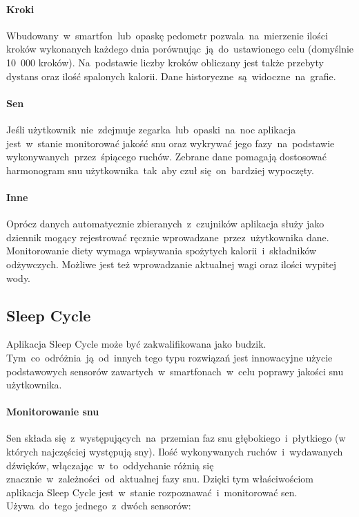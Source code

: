 \paragraph{Kroki} Wbudowany~w~smartfon~lub~opaskę pedometr pozwala~na~mierzenie ilości kroków wykonanych każdego dnia porównując~ją~do~ustawionego celu (domyślnie 10~000 kroków). Na~podstawie liczby kroków obliczany jest także przebyty dystans oraz ilość spalonych kalorii. Dane historyczne~są~widoczne~na~grafie.

\paragraph{Sen} Jeśli użytkownik~nie~zdejmuje zegarka~lub~opaski~na~noc aplikacja jest~w~stanie monitorować jakość snu oraz wykrywać jego fazy~na~podstawie wykonywanych~przez~śpiącego ruchów. Zebrane dane pomagają dostosować harmonogram snu użytkownika~tak~aby czuł się~on~bardziej wypoczęty.

\paragraph{Inne} Oprócz danych automatycznie zbieranych~z~czujników aplikacja służy jako dziennik mogący rejestrować ręcznie wprowadzane~przez~użytkownika dane. Monitorowanie diety wymaga wpisywania spożytych kalorii~i~składników odżywczych. Możliwe jest też wprowadzanie aktualnej wagi oraz ilości wypitej wody. 

\subsection{Sleep Cycle}
\label{sec:sleep_cycle}
Aplikacja Sleep Cycle może być zakwalifikowana jako budzik. Tym~co~odróżnia~ją~od~innych tego typu rozwiązań jest innowacyjne użycie podstawowych sensorów zawartych~w~smartfonach~w~celu poprawy jakości snu użytkownika. 

\paragraph{Monitorowanie snu}
Sen składa się~z~występujących~na~przemian faz snu głębokiego~i~płytkiego (w których najczęściej występują sny). Ilość wykonywanych ruchów~i~wydawanych dźwięków, włączając~w~to~oddychanie różnią się znacznie~w~zależności~od~aktualnej fazy snu. Dzięki tym właściwościom aplikacja Sleep Cycle jest~w~stanie rozpoznawać~i~monitorować sen. Używa~do~tego jednego~z~dwóch sensorów:

